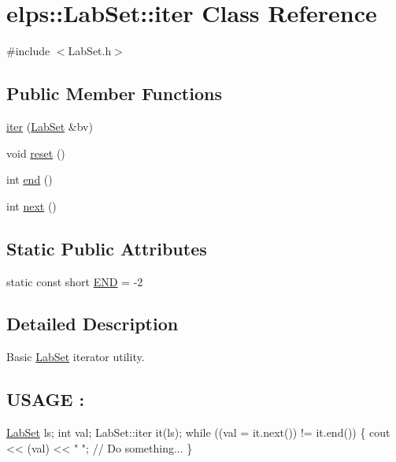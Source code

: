 \hypertarget{classelps_1_1_lab_set_1_1iter}{\section{elps\+:\+:Lab\+Set\+:\+:iter Class Reference}
\label{classelps_1_1_lab_set_1_1iter}
}


{\ttfamily \#include $<$Lab\+Set.\+h$>$}

\subsection*{Public Member Functions}
\begin{DoxyCompactItemize}
\item 
\hyperlink{classelps_1_1_lab_set_1_1iter_a4ce2c82e29e1314dffb25c34fdcd4096}{iter} (\hyperlink{classelps_1_1_lab_set}{Lab\+Set} \&bv)
\item 
void \hyperlink{classelps_1_1_lab_set_1_1iter_a867caedc2218e3d5ddf53c0cee738abc}{reset} ()
\item 
int \hyperlink{classelps_1_1_lab_set_1_1iter_aa243079029f759bf686753fda888dd2b}{end} ()
\item 
int \hyperlink{classelps_1_1_lab_set_1_1iter_a4913c7e81c6d373a663ad383e558f501}{next} ()
\end{DoxyCompactItemize}
\subsection*{Static Public Attributes}
\begin{DoxyCompactItemize}
\item 
static const short \hyperlink{classelps_1_1_lab_set_1_1iter_a21b88b52f2cbfdfe83ae1b5996e71e6e}{E\+N\+D} = -\/2
\end{DoxyCompactItemize}


\subsection{Detailed Description}
Basic \hyperlink{classelps_1_1_lab_set}{Lab\+Set} iterator utility.

\subsection*{U\+S\+A\+G\+E \+: }


\begin{DoxyCode}
\hyperlink{classelps_1_1_lab_set_aea6526eace0dcc7acdd5805b0b4534f7}{LabSet} ls;
\textcolor{keywordtype}{int} val;
LabSet::iter it(ls);
\textcolor{keywordflow}{while} ((val = it.next()) != it.end())
\{
                cout << (val) << \textcolor{stringliteral}{" "};                   \textcolor{comment}{// Do something...}
\}
\end{DoxyCode}


